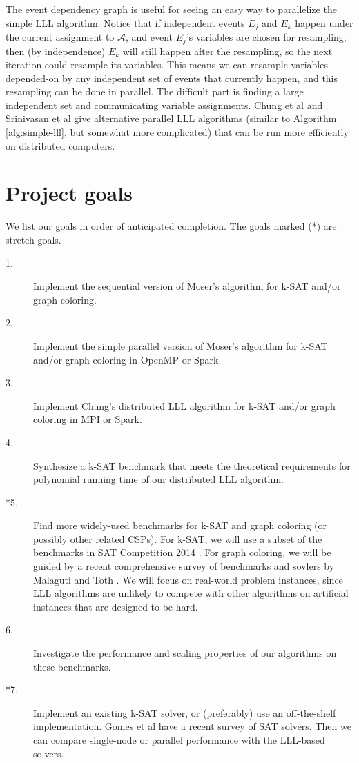 \documentclass{article}
\begin{document}
The event dependency graph is useful for seeing an easy way to parallelize the simple LLL algorithm.  Notice that if independent events $E_j$ and $E_k$ happen under the current assignment to $\mathcal{A}$, and event $E_j$'s variables are chosen for resampling, then (by independence) $E_k$ will still happen after the resampling, so the next iteration could resample its variables.  This means we can resample variables depended-on by any independent set of events that currently happen, and this resampling can be done in parallel.  The difficult part is finding a large independent set and communicating variable assignments.  Chung et al \cite{chung2014distributed} and Srinivasan et al \cite{haeupler2011new} give alternative parallel LLL algorithms (similar to Algorithm \ref{alg:simple-lll}, but somewhat more complicated) that can be run more efficiently on distributed computers.

\section{Project goals}
We list our goals in order of anticipated completion.  The goals marked (*) are stretch goals.

\begin{description}
  \item[1.] Implement the sequential version of Moser's algorithm for k-SAT and/or graph coloring.
  \item[2.] Implement the simple parallel version of Moser's algorithm for k-SAT and/or graph coloring in OpenMP or Spark.
  \item[3.] Implement Chung's distributed LLL algorithm for k-SAT and/or graph coloring in MPI or Spark.
  \item[4.] Synthesize a k-SAT benchmark that meets the theoretical requirements for polynomial running time of our distributed LLL algorithm.
  \item[*5.] Find more widely-used benchmarks for k-SAT and graph coloring (or possibly other related CSPs).  For k-SAT, we will use a subset of the benchmarks in SAT Competition 2014 \cite{balint2013generating, belov2014application}.  For graph coloring, we will be guided by a recent comprehensive survey of benchmarks and sovlers by Malaguti and Toth \cite{malaguti2010survey}.  We will focus on real-world problem instances, since LLL algorithms are unlikely to compete with other algorithms on artificial instances that are designed to be hard.
  \item[6.] Investigate the performance and scaling properties of our algorithms on these benchmarks.
  \item[*7.] Implement an existing k-SAT solver, or (preferably) use an off-the-shelf implementation.  Gomes et al \cite{gomes2008satisfiability} have a recent survey of SAT solvers.  Then we can compare single-node or parallel performance with the LLL-based solvers.
\end{description}



\end{document}
